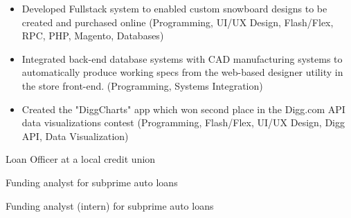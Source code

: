 \begin{itemize}
  \item Developed Fullstack system to enabled custom snowboard designs to be created and purchased online {\tiny (Programming, UI/UX Design, Flash/Flex, RPC, PHP, Magento, Databases)}
  \item Integrated back-end database systems with CAD manufacturing systems to automatically produce working specs from the web-based designer utility in the store front-end. {\tiny (Programming, Systems Integration)}
\end{itemize}

\begin{itemize}
  \item Created the "DiggCharts" app which won second place in the Digg.com API data visualizations contest {\tiny (Programming, Flash/Flex, UI/UX Design, Digg API, Data Visualization)}
\end{itemize}

\divider



Loan Officer at a local credit union

\divider

Funding analyst for subprime auto loans

\divider

Funding analyst (intern) for subprime auto loans

\bigskip
